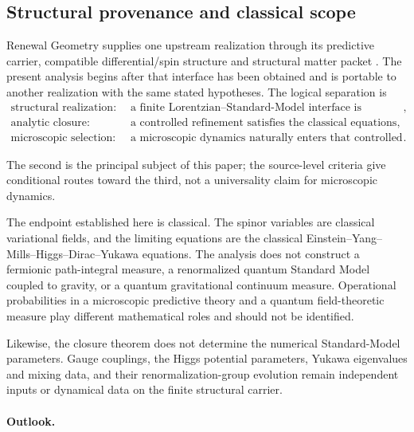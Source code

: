 \documentclass[11pt]{article}
\numberwithin{equation}{section}
\theoremstyle{definition}
\theoremstyle{remark}
\begin{document}
\subsection{Structural provenance and classical scope}

Renewal Geometry supplies one upstream realization through its predictive
carrier, compatible differential/spin structure and structural matter packet
\cite{PelissierRenewalSpacetime2026,PelissierSpectral2026,PelissierDuality2026}.
The present analysis begins after that interface has been obtained and is
portable to another realization with the same stated hypotheses. The
logical separation is
\begin{equation}
\begin{aligned}
\text{structural realization:}\quad&
\text{a finite Lorentzian--Standard-Model interface is obtained},\\
\text{analytic closure:}\quad&
\text{a controlled refinement satisfies the classical equations},\\
\text{microscopic selection:}\quad&
\text{a microscopic dynamics naturally enters that controlled class}.
\end{aligned}
\label{eq:discussion-three-levels}
\end{equation}

The second is the principal subject of this paper; the source-level
criteria give conditional routes toward the third, not a universality
claim for microscopic dynamics.

The endpoint established here is classical.  The spinor variables are
classical variational fields, and the limiting equations are the classical
Einstein--Yang--Mills--Higgs--Dirac--Yukawa equations.  The analysis does not
construct a fermionic path-integral measure, a renormalized quantum
Standard Model coupled to gravity, or a quantum gravitational continuum
measure.  Operational probabilities in a microscopic predictive theory and a
quantum field-theoretic measure play different mathematical roles and should
not be identified.

Likewise, the closure theorem does not determine the numerical Standard-Model
parameters.  Gauge couplings, the Higgs potential parameters, Yukawa
eigenvalues and mixing data, and their renormalization-group evolution remain
independent inputs or dynamical data on the finite structural carrier.

\paragraph{Outlook.}
\end{document}
